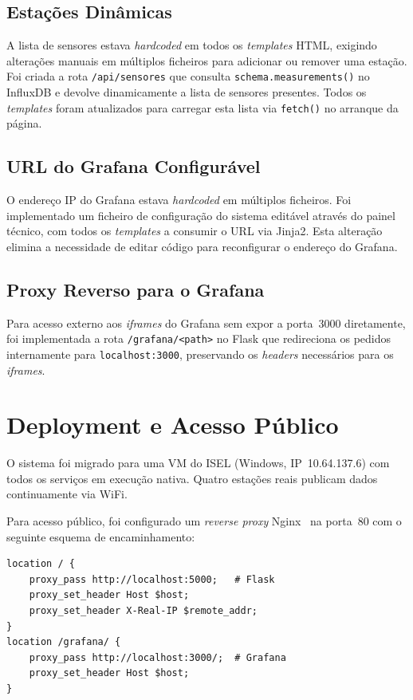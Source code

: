 \documentclass[12pt,a4paper]{report}
\begin{document}
\subsection{Estações Dinâmicas}

A lista de sensores estava \textit{hardcoded} em todos os \textit{templates} HTML, exigindo alterações manuais em múltiplos ficheiros para adicionar ou remover uma estação. Foi criada a rota \texttt{/api/sensores} que consulta \texttt{schema.measurements()} no InfluxDB e devolve dinamicamente a lista de sensores presentes. Todos os \textit{templates} foram atualizados para carregar esta lista via \texttt{fetch()} no arranque da página.

\subsection{URL do Grafana Configurável}

O endereço IP do Grafana estava \textit{hardcoded} em múltiplos ficheiros. Foi implementado um ficheiro de configuração do sistema editável através do painel técnico, com todos os \textit{templates} a consumir o URL via Jinja2. Esta alteração elimina a necessidade de editar código para reconfigurar o endereço do Grafana.

\subsection{Proxy Reverso para o Grafana}

Para acesso externo aos \textit{iframes} do Grafana sem expor a porta~3000 diretamente, foi implementada a rota \texttt{/grafana/<path>} no Flask que redireciona os pedidos internamente para \texttt{localhost:3000}, preservando os \textit{headers} necessários para os \textit{iframes}.

\section{Deployment e Acesso Público}
\label{sec:deploy}

O sistema foi migrado para uma VM do ISEL (Windows, IP~10.64.137.6) com todos os serviços em execução nativa. Quatro estações reais publicam dados continuamente via WiFi.

Para acesso público, foi configurado um \textit{reverse proxy} Nginx~\cite{nginx} na porta~80 com o seguinte esquema de encaminhamento:

\begin{lstlisting}[style=bash, caption={Configuração Nginx (excerto)}]
location / {
    proxy_pass http://localhost:5000;   # Flask
    proxy_set_header Host $host;
    proxy_set_header X-Real-IP $remote_addr;
}
location /grafana/ {
    proxy_pass http://localhost:3000/;  # Grafana
    proxy_set_header Host $host;
}
\end{lstlisting}
\end{document}
